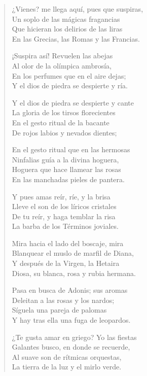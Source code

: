 \documentclass[12pt]{article}
\begin{document}
\clearpage
{}
\begin{verse}

¿Vienes? me llega aquí, pues que suspiras,\\
Un soplo de las mágicas fragancias\\
Que hicieran los delirios de las liras\\
En las Grecias, las Romas y las Francias.  

¡Suspira así! Revuelen las abejas\\
Al olor de la olímpica ambrosía,\\
En los perfumes que en el aire dejas;\\
Y el dios de piedra se despierte y ría.  

Y el dios de piedra se despierte y cante\\
La gloria de los tirsos florecientes\\
En el gesto ritual de la bacante\\
De rojos labios y nevados dientes;  

En el gesto ritual que en las hermosas\\
Ninfalias guía a la divina hoguera,\\
Hoguera que hace llamear las rosas\\
En las manchadas pieles de pantera.  

Y pues amas reír, ríe, y la brisa\\
Lleve el son de los líricos cristales\\
De tu reír, y haga temblar la risa\\
La barba de los Términos joviales.  

Mira hacia el lado del boscaje, mira\\
Blanquear el muslo de marfil de Diana,\\
Y después de la Virgen, la Hetaira\\
Diosa, su blanca, rosa y rubia hermana.  

Pasa en busca de Adonis; sus aromas\\
Deleitan a las rosas y los nardos;\\
Síguela una pareja de palomas\\
Y hay tras ella una fuga de leopardos.  

¿Te gusta amar en griego? Yo las fiestas\\
Galantes busco, en donde se recuerde,\\
Al suave son de rítmicas orquestas,\\
La tierra de la luz y el mirlo verde.  


\end{verse}
\end{document}
